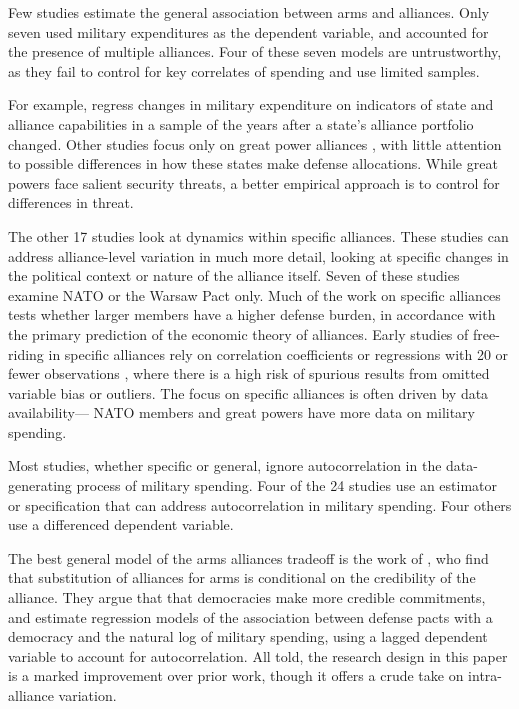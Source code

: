 \documentclass[12pt]{article}
\begin{document}
Few studies estimate the general association between arms and alliances. Only seven used military expenditures as the dependent variable, and accounted for the presence of multiple alliances. Four of these seven models are untrustworthy, as they fail to control for key correlates of spending and use limited samples. 

For example, \citet{MorganPalmer2003} regress changes in military expenditure on indicators of state and alliance capabilities in a sample of the years after a state's alliance portfolio changed. Other studies focus only on great power alliances \citep{ConybeareSandler1990, Conybeare1994, Diehl1994, MostSiverson1987}, with little attention to possible differences in how these states make defense allocations. While great powers face salient security threats, a better empirical approach is to control for differences in threat. 

The other 17 studies look at dynamics within specific alliances. These studies can address alliance-level variation in much more detail, looking at specific changes in the political context or nature of the alliance itself. Seven of these studies examine NATO or the Warsaw Pact only. Much of the work on specific alliances tests whether larger members have a higher defense burden, in accordance with the primary prediction of the economic theory of alliances. Early studies of free-riding in specific alliances rely on correlation coefficients or regressions with 20 or fewer observations \citep{OlsonZeckhauser1966, Starr1974, Reisinger1983, Siroky2012}, where there is a high risk of spurious results from omitted variable bias or outliers. The focus on specific alliances is often driven by data availability--- NATO members and great powers have more data on military spending. 

Most studies, whether specific or general, ignore autocorrelation in the data-generating process of military spending. Four of the 24 studies use an estimator or specification that can address autocorrelation in military spending. Four others use a differenced dependent variable. 

The best general model of the arms alliances tradeoff is the work of \citet{DigiuseppePoast2016}, who find that substitution of alliances for arms is conditional on the credibility of the alliance. They argue that that democracies make more credible commitments, and estimate regression models of the association between defense pacts with a democracy and the natural log of military spending, using a lagged dependent variable to account for autocorrelation. All told, the research design in this paper is a marked improvement over prior work, though it offers a crude take on intra-alliance variation.  
\end{document}

